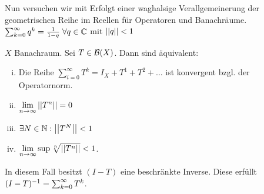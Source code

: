 \documentclass[ngerman]{report}
\begin{document}
Nun versuchen wir mit Erfolgt einer waghalsige Verallgemeinerung der geometrischen Reihe im Reellen für Operatoren und Banachräume. 
	$\sum_{k=0}^\infty q^k = \frac{1}{1-q} \; \forall q\in\mathbb{C}$ mit $\left\lvert \left\lvert q \right\rvert \right\rvert < 1$
	\begin{thm} 
		$X$ Banachraum. Sei $T\in \mathcal{B}(X)$. Dann sind äquivalent: 
			\begin{enumerate}[i)]
				\item Die Reihe $ \sum_{i=0}^\infty T^k = I_X + T^1 + T^2 + \dots$ ist konvergent bzgl. der Operatornorm.
				\item $\displaystyle \lim_{n \to \infty} \left\lvert \left\lvert T^n \right\rvert \right\rvert = 0$
				\item $\exists N\in \mathbb{N}: \left\lvert \left\lvert T^N \right\rvert \right\rvert < 1$
				\item $\displaystyle \lim_{n \to \infty} \sup \sqrt[n]{\left\lvert \left\lvert T^n \right\rvert \right\rvert} < 1$. 
			\end{enumerate}
		In diesem Fall besitzt $(I-T)$ eine beschränkte Inverse.
		Diese erfüllt $(I-T)^{-1} = \sum_{k=0}^\infty T^k$.
	\end{thm}
\end{document}

